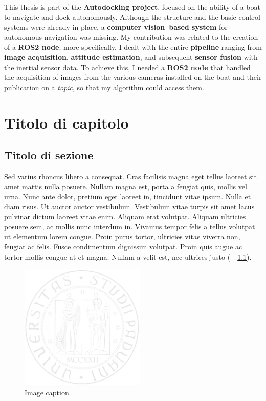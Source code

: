 \documentclass[a4paper,12pt,twoside,openright]{book}
\begin{document}
This thesis is part of the \textbf{Autodocking project}, focused on the ability of a boat to navigate and dock autonomously. Although the structure and the basic control systems were already in place, a \textbf{computer vision–based system} for autonomous navigation was missing. My contribution was related to the creation of a \textbf{ROS2 node}; more specifically, I dealt with the entire \textbf{pipeline} ranging from \textbf{image acquisition}, \textbf{attitude estimation}, and subsequent \textbf{sensor fusion} with the inertial sensor data. To achieve this, I needed a \textbf{ROS2 node} that handled the acquisition of images from the various cameras installed on the boat and their publication on a \textit{topic}, so that my algorithm could access them.

\cleardoublepage
\null
\thispagestyle{plain} %
\addtocounter{page}{1} %
\clearpage

\mainmatter\doublespace 
\chapter{Titolo di capitolo} %
\thispagestyle{empty}

\section{Titolo di sezione}
Sed varius rhoncus libero a consequat. Cras facilisis magna eget tellus laoreet sit amet mattis nulla posuere. Nullam magna est, porta a feugiat quis, mollis vel urna. Nunc ante dolor, pretium eget laoreet in, tincidunt vitae ipsum. Nulla et diam risus. Ut auctor auctor vestibulum. Vestibulum vitae turpis sit amet lacus pulvinar dictum laoreet vitae enim. Aliquam erat volutpat. Aliquam ultricies posuere sem, ac mollis nunc interdum in. Vivamus tempor felis a tellus volutpat ut elementum lorem congue. Proin purus tortor, ultricies vitae viverra non, feugiat ac felis. Fusce condimentum dignissim volutpat. Proin quis augue ac tortor mollis congue at et magna. Nullam a velit est, nec ultrices justo (\seename\ \figurename~\ref{unipd-logo}).

\begin{figure}[ht]
  \centering
  \includegraphics[height=6cm]{images/unipd-light}
  \caption{Image caption}\label{unipd-logo}
\end{figure}
\end{document}
